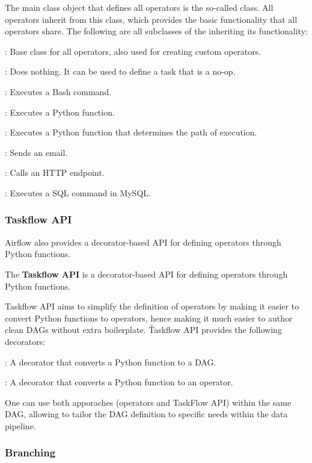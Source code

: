 The main class object that defines all operators is the so-called  class. All operators inherit
from this class, which provides the basic functionality that all operators share. The following are all subclasses of
the  inheriting its functionality:
\bit
\item {}: Base class for all operators, also used for creating custom operators.
\item {}: Does nothing. It can be used to define a task that is a no-op.
\item {}: Executes a Bash command.
\item {}: Executes a Python function.
\item {}: Executes a Python function that determines the path of execution.
\item {}: Sends an email.
\item {}: Calls an HTTP endpoint.
\item {}: Executes a SQL command in MySQL\@.
\eit

\subsubsection{Taskflow API}

Airflow also provides a decorator-based API for defining operators through Python functions.

The \textbf{Taskflow API} is a decorator-based API for defining operators through Python functions.
\ed

Taskflow API aims to simplify the definition of operators by making it easier to convert Python functions to
operators, hence making it much easier to author clean DAGs without extra boilerplate. \v

Taskflow API provides the following decorators:
\bit
\item {}: A decorator that converts a Python function to a DAG\@.
\item {}: A decorator that converts a Python function to an operator.
\eit

One can use both apporaches (operators and TaskFlow API) within the same DAG, allowing to tailor the DAG definition to
specific needs within the data pipeline.

\subsubsection{Branching}

